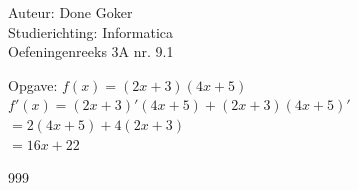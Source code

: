 \documentclass[a4paper]{article}
\begin{document}
\noindent \large Auteur: Done Goker \\
\noindent \large Studierichting: Informatica \\
\noindent \large Oefeningenreeks 3A nr. 9.1 \\

\bigskip 

\normalsize

Opgave: $ f(x) = (2x + 3)(4x + 5)$ \\

$f'(x) = (2x + 3)'(4x + 5) + (2x + 3)(4x + 5)'$ \\

$ = 2(4x + 5) + 4(2x + 3)$ \\

$ = 16x + 22$ \\






\begin{thebibliography}{999}
\end{thebibliography}
\end{document}
